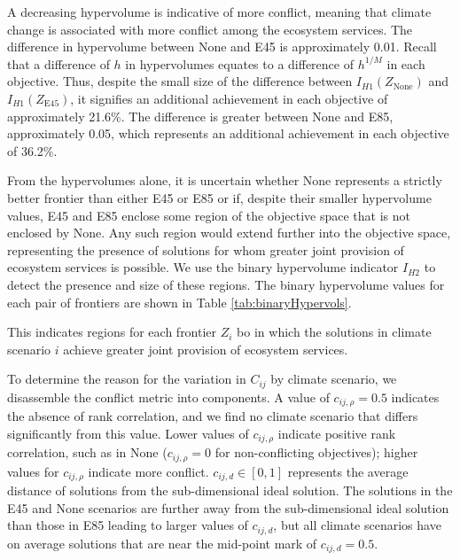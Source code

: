  A decreasing hypervolume is indicative of more conflict, meaning that climate change is associated with more conflict among the ecosystem services.
The difference in hypervolume between None and E45 is approximately 0.01. Recall that a difference of $h$ in hypervolumes equates to a difference of $h^{1/M}$ in each objective. Thus, despite the small size of the difference between $I_{H1}(Z_\text{None})$ and $I_{H1}(Z_\text{E45})$, it signifies an additional achievement in each objective of approximately 21.6\%. The difference is greater between None and E85, approximately 0.05, which represents an additional achievement in each objective of 36.2\%.

From the hypervolumes alone, it is uncertain whether None represents a strictly better frontier than either E45 or E85 or if, despite their smaller hypervolume values, E45 and E85 enclose some region of the objective space that is not enclosed by None. Any such region would extend further into the objective space, representing the presence of solutions for whom greater joint provision of ecosystem services is possible. We use the binary hypervolume indicator $I_{H2}$ to detect the presence and size of these regions. The binary hypervolume values for each pair of frontiers are shown in Table \ref{tab:binaryHypervols}.

This indicates regions for each frontier $Z_i$ bo in which the solutions in climate scenario $i$ achieve greater joint provision of ecosystem services.


To determine the reason for the variation in $C_{ij}$ by climate scenario, we disassemble the conflict metric into components. A value of $c_{ij,\rho} = 0.5$ indicates the absence of rank correlation, and we find no climate scenario that differs significantly from this value. Lower values of $c_{ij,\rho}$ indicate positive rank correlation, such as in None ($c_{ij,\rho}=0$ for non-conflicting objectives); higher values for $c_{ij,\rho}$ indicate more conflict. $c_{ij,d} \in [0,1]$ represents the average distance of solutions from the sub-dimensional ideal solution. The solutions in the E45 and None scenarios are further away from the sub-dimensional ideal solution than those in E85 leading to larger values of $c_{ij,d}$, but all climate scenarios have on average solutions that are near the mid-point mark of $c_{ij,d} = 0.5$.

